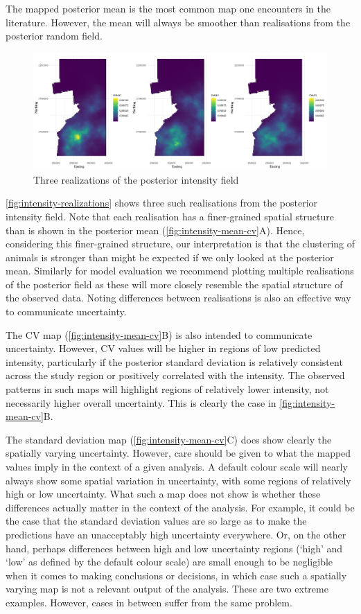 \documentclass[preprint,12pt]{elsarticle}
\begin{document}
The mapped posterior mean is the most common map one encounters in the literature.  However, the mean will always be smoother than realisations from the posterior random field.
\begin{figure}
	\includegraphics[scale=0.525]{figures/intensity_realized.png}
	\caption{Three realizations of the posterior intensity field}
	\label{fig:intensity-realizations}
\end{figure}  
\autoref{fig:intensity-realizations} shows three such realisations from the posterior intensity field.  Note that each realisation has a finer-grained spatial structure than is shown in the posterior mean (\autoref{fig:intensity-mean-cv}A).  Hence, considering this finer-grained structure, our interpretation is that the clustering of animals is stronger than might be expected if we only looked at the posterior mean.  Similarly for model evaluation we recommend plotting multiple realisations of the posterior field as these will more closely resemble the spatial structure of the observed data.  Noting differences between realisations is also an effective way to communicate uncertainty.

The CV map (\autoref{fig:intensity-mean-cv}B) is also intended to communicate uncertainty.  However, CV values will be higher in regions of low predicted intensity, particularly if the posterior standard deviation is relatively consistent across the study region or positively correlated with the intensity.  The observed patterns in such maps will highlight regions of relatively lower intensity, not necessarily higher overall uncertainty.  This is clearly the case in \autoref{fig:intensity-mean-cv}B.  

The standard deviation map (\autoref{fig:intensity-mean-cv}C) does show clearly the spatially varying uncertainty.  However,  care should be given to what the mapped values imply in the context of a given analysis.  A default colour scale will nearly always show some spatial variation in uncertainty, with some regions of relatively high or low uncertainty.  What such a map does not show is whether these differences actually matter in the context of the analysis.  For example, it could be the case that the standard deviation values are so large as to make the predictions have an unacceptably high uncertainty everywhere.  Or, on the other hand, perhaps differences between high and low uncertainty regions (`high' and `low' as defined by the default colour scale) are small enough to be negligible when it comes to making conclusions or decisions, in which case such a spatially varying map is not a relevant output of the analysis.  These are two extreme examples.  However, cases in between suffer from the same problem.  
\end{document}

